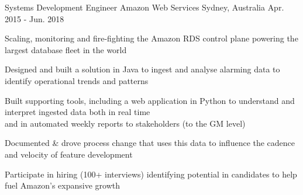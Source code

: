\begin{cventries}
  \cventry
    {Systems Development Engineer} %
    {Amazon Web Services} %
    {Sydney, Australia} %
    {Apr. 2015 - Jun. 2018} %
    {
      \begin{cvitems} %
        \item {Scaling, monitoring and fire-fighting the Amazon RDS control plane powering the largest database fleet in the world}
        \item {Designed and built a solution in Java to ingest and analyse alarming data to identify operational trends and patterns }
        \item {Built supporting tools, including a web application in Python to understand and interpret ingested data both in real time\\
        and in automated weekly reports to stakeholders (to the GM level)}
        \item {Documented \& drove process change that uses this data to influence the cadence and velocity of feature development }
        \item {Participate in hiring (100+ interviews) identifying potential in candidates to help fuel Amazon's expansive growth}
      \end{cvitems}
    }
\end{cventries}
